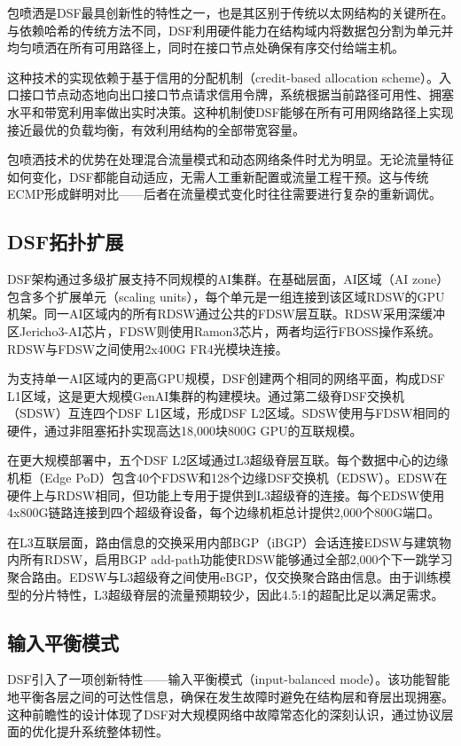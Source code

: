 包喷洒是DSF最具创新性的特性之一，也是其区别于传统以太网结构的关键所在。与依赖哈希的传统方法不同，DSF利用硬件能力在结构域内将数据包分割为单元并均匀喷洒在所有可用路径上，同时在接口节点处确保有序交付给端主机。

这种技术的实现依赖于基于信用的分配机制（credit-based allocation scheme）。入口接口节点动态地向出口接口节点请求信用令牌，系统根据当前路径可用性、拥塞水平和带宽利用率做出实时决策。这种机制使DSF能够在所有可用网络路径上实现接近最优的负载均衡，有效利用结构的全部带宽容量。

包喷洒技术的优势在处理混合流量模式和动态网络条件时尤为明显。无论流量特征如何变化，DSF都能自动适应，无需人工重新配置或流量工程干预。这与传统ECMP形成鲜明对比——后者在流量模式变化时往往需要进行复杂的重新调优。

\subsection{DSF拓扑扩展}

DSF架构通过多级扩展支持不同规模的AI集群。在基础层面，AI区域（AI zone）包含多个扩展单元（scaling units），每个单元是一组连接到该区域RDSW的GPU机架。同一AI区域内的所有RDSW通过公共的FDSW层互联。RDSW采用深缓冲区Jericho3-AI芯片，FDSW则使用Ramon3芯片，两者均运行FBOSS操作系统。RDSW与FDSW之间使用2x400G FR4光模块连接。

为支持单一AI区域内的更高GPU规模，DSF创建两个相同的网络平面，构成DSF L1区域，这是更大规模GenAI集群的构建模块。通过第二级脊DSF交换机（SDSW）互连四个DSF L1区域，形成DSF L2区域。SDSW使用与FDSW相同的硬件，通过非阻塞拓扑实现高达18,000块800G GPU的互联规模。

在更大规模部署中，五个DSF L2区域通过L3超级脊层互联。每个数据中心的边缘机柜（Edge PoD）包含40个FDSW和128个边缘DSF交换机（EDSW）。EDSW在硬件上与RDSW相同，但功能上专用于提供到L3超级脊的连接。每个EDSW使用4x800G链路连接到四个超级脊设备，每个边缘机柜总计提供2,000个800G端口。

在L3互联层面，路由信息的交换采用内部BGP（iBGP）会话连接EDSW与建筑物内所有RDSW，启用BGP add-path功能使RDSW能够通过全部2,000个下一跳学习聚合路由。EDSW与L3超级脊之间使用eBGP，仅交换聚合路由信息。由于训练模型的分片特性，L3超级脊层的流量预期较少，因此4.5:1的超配比足以满足需求。

\subsection{输入平衡模式}

DSF引入了一项创新特性——输入平衡模式（input-balanced mode）。该功能智能地平衡各层之间的可达性信息，确保在发生故障时避免在结构层和脊层出现拥塞。这种前瞻性的设计体现了DSF对大规模网络中故障常态化的深刻认识，通过协议层面的优化提升系统整体韧性。

